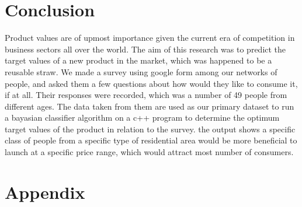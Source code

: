 \documentclass[conference]{IEEEtran}
\begin{document}
\section{Conclusion}

 Product values are of upmost importance given the current era of competition in business sectors all over the world. The aim of this research was to predict the target values of a new product in the market, which was happened to be a reusable straw. We made a survey using google form among our networks of people, and asked them a few questions about how would they like to consume it, if at all. Their responses were recorded, which was a number of 49 people from different ages. The data taken from them are used as our primary dataset to run a bayasian classifier algorithm on a c++ program to determine the optimum target values of the product in relation to the survey. the output shows a specific class of people from a specific type of residential area would be more beneficial to launch at a specific price range, which would attract most number of consumers.    

\section{Appendix}
\end{document}
